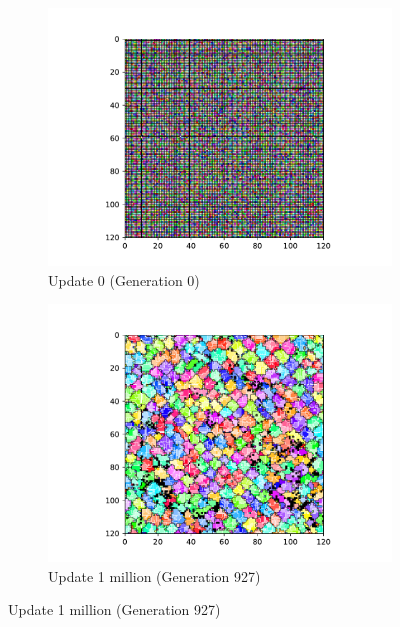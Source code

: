 \begin{figure}[t]
\begin{center}
\begin{subfigure}[b]{0.5\columnwidth}
  \includegraphics[width=\columnwidth,trim={2.5cm 0.5cm 2.5cm 1cm},clip]{img/ChannelMap_1011_update0}
  \caption{Update 0 (Generation 0)}
  \label{fig:ChannelMap_1011_update0}
\end{subfigure}%
\begin{subfigure}[b]{0.5\columnwidth}
  \includegraphics[width=\columnwidth,trim={2.5cm 0.5cm 2.5cm 1cm},clip]{img/ChannelMap_1011_update1000000}
  \caption{Update 1 million (Generation 927)}
  \label{fig:ChannelMap_1011_update1000000}
\end{subfigure}

\end{center}
\end{figure}
